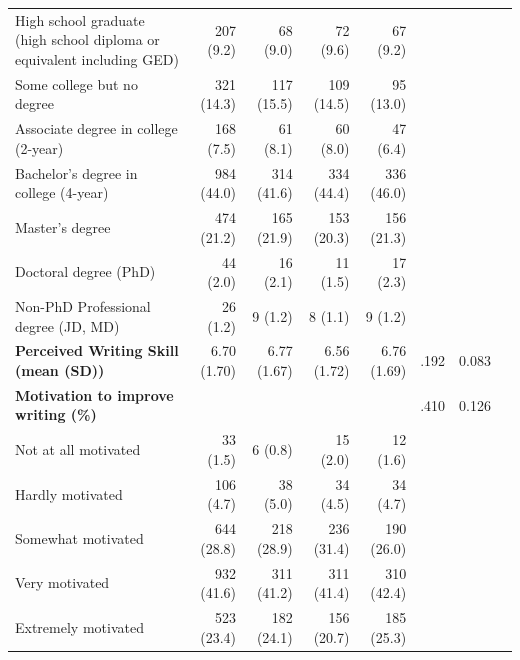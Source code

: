 \documentclass[11pt]{report}
\begin{document}
\begin{append}
\begin{table}[ht]
\begin{tabular}{lrrrrrrr}
   \hspace{1em}High school graduate (high school diploma or equivalent including GED) &  207 (9.2)  &   68 (9.0)  &   72 (9.6)  &   67 (9.2)  &  &  \\ 
   \hspace{1em}Some college but no degree &  321 (14.3)  &  117 (15.5)  &  109 (14.5)  &   95 (13.0)  &  &   \\ 
   \hspace{1em}Associate degree in college (2-year) &  168 (7.5)  &   61 (8.1)  &   60 (8.0)  &   47 (6.4)    &  &  \\ 
   \hspace{1em}Bachelor's degree in college (4-year) &  984 (44.0)  &  314 (41.6)  &  334 (44.4)  &  336 (46.0)  &  &    \\ 
   \hspace{1em}Master's degree &  474 (21.2)  &  165 (21.9)  &  153 (20.3)  &  156 (21.3)  &  &    \\ 
   \hspace{1em}Doctoral degree (PhD) &   44 (2.0)  &   16 (2.1)  &   11 (1.5)  &   17 (2.3)  &  &    \\ 
   \hspace{1em}Non-PhD Professional degree (JD, MD) &   26 (1.2)  &    9 (1.2)  &    8 (1.1)  &    9 (1.2)  &    &  \\ 
\textbf{Perceived Writing Skill (mean (SD))} & 6.70 (1.70) & 6.77 (1.67) & 6.56 (1.72) & 6.76 (1.69) & .192 &    0.083 \\ 
\textbf{Motivation to improve writing (\%)} &  &   &   &   & .410 &    0.126 \\ 
   \hspace{1em}Not at all motivated &   33 (1.5)  &    6 (0.8)  &   15 (2.0)  &   12 (1.6)  &  &    \\ 
   \hspace{1em}Hardly motivated &  106 (4.7)  &   38 (5.0)  &   34 (4.5)  &   34 (4.7)  &  &    \\ 
   \hspace{1em}Somewhat motivated &  644 (28.8)  &  218 (28.9)  &  236 (31.4)  &  190 (26.0)  &  &    \\ 
   \hspace{1em}Very motivated &  932 (41.6)  &  311 (41.2)  &  311 (41.4)  &  310 (42.4)  &  &    \\ 
   \hspace{1em}Extremely motivated &  523 (23.4)  &  182 (24.1)  &  156 (20.7)  &  185 (25.3)  &  &    \\ 

\end{tabular}
\end{table}
\end{append}
\end{document}
